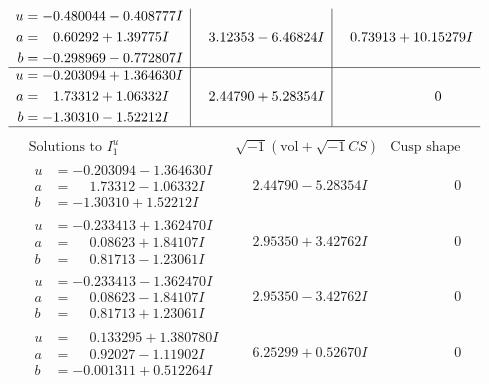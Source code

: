 \documentclass[1p]{elsarticle_modified}
\theoremstyle{definition}
\newcommand{\I}{\sqrt{-1}}
\begin{document}
$$\begin{array}{c|c|c}
\begin{aligned}
u &= -0.480044 - 0.408777 I \\
a &= \phantom{-}0.60292 + 1.39775 I \\
b &= -0.298969 - 0.772807 I\end{aligned}
 & \phantom{-}3.12353 - 6.46824 I & \phantom{-}0.73913 + 10.15279 I \\ \hline\begin{aligned}
u &= -0.203094 + 1.364630 I \\
a &= \phantom{-}1.73312 + 1.06332 I \\
b &= -1.30310 - 1.52212 I\end{aligned}
 & \phantom{-}2.44790 + 5.28354 I & \phantom{-0.000000 } 0\\
 \hline 
 \end{array}$$\newpage$$\begin{array}{c|c|c}  
\text{Solutions to }I^u_{1}& \I (\text{vol} + \sqrt{-1}CS) & \text{Cusp shape}\\
 \hline 
\begin{aligned}
u &= -0.203094 - 1.364630 I \\
a &= \phantom{-}1.73312 - 1.06332 I \\
b &= -1.30310 + 1.52212 I\end{aligned}
 & \phantom{-}2.44790 - 5.28354 I & \phantom{-0.000000 } 0 \\ \hline\begin{aligned}
u &= -0.233413 + 1.362470 I \\
a &= \phantom{-}0.08623 + 1.84107 I \\
b &= \phantom{-}0.81713 - 1.23061 I\end{aligned}
 & \phantom{-}2.95350 + 3.42762 I & \phantom{-0.000000 } 0 \\ \hline\begin{aligned}
u &= -0.233413 - 1.362470 I \\
a &= \phantom{-}0.08623 - 1.84107 I \\
b &= \phantom{-}0.81713 + 1.23061 I\end{aligned}
 & \phantom{-}2.95350 - 3.42762 I & \phantom{-0.000000 } 0 \\ \hline\begin{aligned}
u &= \phantom{-}0.133295 + 1.380780 I \\
a &= \phantom{-}0.92027 - 1.11902 I \\
b &= -0.001311 + 0.512264 I\end{aligned}
 & \phantom{-}6.25299 + 0.52670 I & \phantom{-0.000000 } 0 \\ \hline\begin{aligned}

\end{aligned}
\end{array}$$
\end{document}
